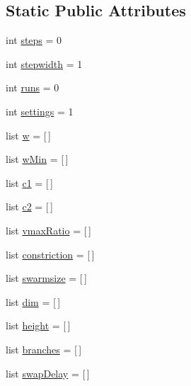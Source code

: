 \subsection*{Static Public Attributes}
\begin{CompactItemize}
\item 
int \hyperlink{classpsoParameter_1_1PsoParameter3_d2a441e49e2928f01b4af3ad64a85e1f}{steps} = 0
\item 
int \hyperlink{classpsoParameter_1_1PsoParameter3_f667ae92b860b9d115b74699df1562c4}{stepwidth} = 1
\item 
int \hyperlink{classpsoParameter_1_1PsoParameter3_908a5f0219a1fd8f38ddfb425db77936}{runs} = 0
\item 
int \hyperlink{classpsoParameter_1_1PsoParameter3_159e9d2181a114d1c66da2d54bdb68ce}{settings} = 1
\item 
list \hyperlink{classpsoParameter_1_1PsoParameter3_a343b6dfff71ba7be83cdb1e5d5e83a0}{w} = \mbox{[}$\,$\mbox{]}
\item 
list \hyperlink{classpsoParameter_1_1PsoParameter3_82977e433773707552c0682494fc76b9}{wMin} = \mbox{[}$\,$\mbox{]}
\item 
list \hyperlink{classpsoParameter_1_1PsoParameter3_47e030e132fddcb5ca5a81d59efed6e1}{c1} = \mbox{[}$\,$\mbox{]}
\item 
list \hyperlink{classpsoParameter_1_1PsoParameter3_6298dd3a39ff04fc739f5795913f8d43}{c2} = \mbox{[}$\,$\mbox{]}
\item 
list \hyperlink{classpsoParameter_1_1PsoParameter3_1488a5f92b21091e332236783e9f7bce}{vmaxRatio} = \mbox{[}$\,$\mbox{]}
\item 
list \hyperlink{classpsoParameter_1_1PsoParameter3_270b6f2eb980086569c871f7b940d593}{constriction} = \mbox{[}$\,$\mbox{]}
\item 
list \hyperlink{classpsoParameter_1_1PsoParameter3_a521f7aa9a638e52d1549e4f50ab3af3}{swarmsize} = \mbox{[}$\,$\mbox{]}
\item 
list \hyperlink{classpsoParameter_1_1PsoParameter3_087122370ab2c8e77ce70590ea19153a}{dim} = \mbox{[}$\,$\mbox{]}
\item 
list \hyperlink{classpsoParameter_1_1PsoParameter3_e07518c626674e236febdac7bd4db9db}{height} = \mbox{[}$\,$\mbox{]}
\item 
list \hyperlink{classpsoParameter_1_1PsoParameter3_73d56604517c3299e5f5bbc9086fb72f}{branches} = \mbox{[}$\,$\mbox{]}
\item 
list \hyperlink{classpsoParameter_1_1PsoParameter3_9da95251f481131ecab94917122689a0}{swapDelay} = \mbox{[}$\,$\mbox{]}

\end{CompactItemize}
